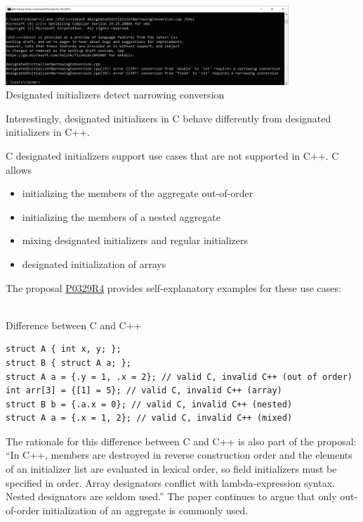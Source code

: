 \begin{center}
\includegraphics[width=0.8\textwidth]{content/3/chapter4/images/35.png}\\
Designated initializers detect narrowing conversion
\end{center}

Interestingly, designated initializers in C behave differently from designated initializers in C++.

\begin{tcolorbox}[breakable,enhanced jigsaw,colback=red!5!white,colframe=red!75!black,title={Similarity to Python}]
C designated initializers support use cases that are not supported in C++. C allows

\begin{itemize}
\item 
initializing the members of the aggregate out-of-order

\item 
initializing the members of a nested aggregate

\item 
mixing designated initializers and regular initializers

\item 
designated initialization of arrays
\end{itemize}

The proposal \href{http://www.open-std.org/jtc1/sc22/wg21/docs/papers/2017/p0329r4.pdf}{P0329R4} provides self-explanatory examples for these use cases:

\hspace*{\fill} \\ %
\noindent
Difference between C and C++
\begin{lstlisting}[style=styleCXX]
struct A { int x, y; };
struct B { struct A a; };
struct A a = {.y = 1, .x = 2}; // valid C, invalid C++ (out of order)
int arr[3] = {[1] = 5}; // valid C, invalid C++ (array)
struct B b = {.a.x = 0}; // valid C, invalid C++ (nested)
struct A a = {.x = 1, 2}; // valid C, invalid C++ (mixed)
\end{lstlisting}

The rationale for this difference between C and C++ is also part of the proposal: “In C++, members are destroyed in reverse construction order and the elements of an initializer list are evaluated in lexical order, so field initializers must be specified in order. Array designators conflict with lambda-expression syntax. Nested designators are seldom used.” The paper continues to argue that only out-of-order initialization of an aggregate is commonly used.

\end{tcolorbox}	

